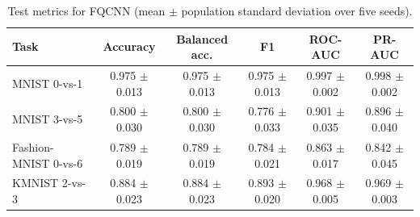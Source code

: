 \documentclass[conference]{IEEEtran}
\begin{document}
\begin{table}[!t]
\caption{Test metrics for FQCNN (mean $\pm$ population standard deviation over five seeds).}
\label{tab:q1metrics}
\centering
\begin{tabular}{lccccc}
\toprule
\textbf{Task} & \textbf{Accuracy} & \textbf{Balanced acc.} & \textbf{F1} & \textbf{ROC-AUC} & \textbf{PR-AUC} \\
\midrule
MNIST 0-vs-1 &  0.975 $\pm$ 0.013 & 0.975 $\pm$ 0.013 & 0.975 $\pm$ 0.013 & 0.997 $\pm$ 0.002 & 0.998 $\pm$ 0.002 \\
MNIST 3-vs-5 &  0.800 $\pm$ 0.030 & 0.800 $\pm$ 0.030 & 0.776 $\pm$ 0.033 & 0.901 $\pm$ 0.035 & 0.896 $\pm$ 0.040 \\
Fashion-MNIST 0-vs-6 &  0.789 $\pm$ 0.019 & 0.789 $\pm$ 0.019 & 0.784 $\pm$ 0.021 & 0.863 $\pm$ 0.017 & 0.842 $\pm$ 0.045 \\
KMNIST 2-vs-3 &  0.884 $\pm$ 0.023 & 0.884 $\pm$ 0.023 & 0.893 $\pm$ 0.020 & 0.968 $\pm$ 0.005 & 0.969 $\pm$ 0.003 \\
\bottomrule
\end{tabular}
\end{table}
\end{document}
